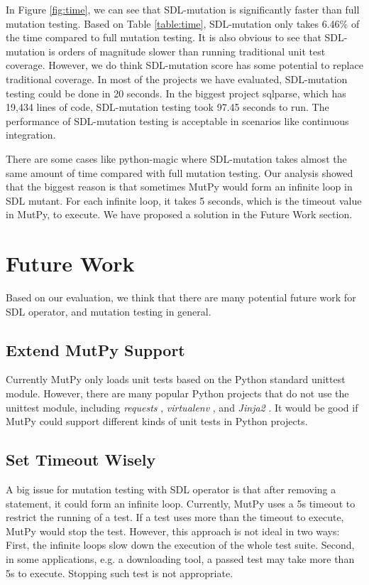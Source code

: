 \documentclass[12pt]{article}
\begin{document}
In Figure \ref{fig:time}, we can see that SDL-mutation is significantly faster than full mutation testing.  Based on Table \ref{table:time}, SDL-mutation only takes 6.46\% of the time compared to full mutation testing. It is also obvious to see that SDL-mutation is orders of magnitude slower than running traditional unit test coverage. However, we do think SDL-mutation score has some potential to replace traditional coverage. In most of the projects we have evaluated, SDL-mutation testing could be done in 20 seconds. In the biggest project sqlparse, which has 19,434 lines of code, SDL-mutation testing took 97.45 seconds to run. The performance of SDL-mutation testing is acceptable in scenarios like continuous integration.

There are some cases like python-magic where SDL-mutation takes almost the same amount of time compared with full mutation testing. Our analysis showed that the biggest reason is that sometimes MutPy would form an infinite loop in SDL mutant. For each infinite loop, it takes 5 seconds, which is the timeout value in MutPy, to execute. We have proposed a solution in the Future Work section.

\section{Future Work}

Based on our evaluation, we think that there are many potential future work for SDL operator, and mutation testing in general.

\subsection{Extend MutPy Support}

Currently MutPy only loads unit tests based on the Python standard unittest module. However, there are many popular Python projects that do not use the unittest module, including \emph{requests} \cite{requests}, \emph{virtualenv} \cite{virtualenv}, and \emph{Jinja2} \cite{jinja2}. It would be good if MutPy could support different kinds of unit tests in Python projects.

\subsection{Set Timeout Wisely}

A big issue for mutation testing with SDL operator is that after removing a statement, it could form an infinite loop. Currently, MutPy uses a 5s timeout to restrict the running of a test. If a test uses more than the timeout to execute, MutPy would stop the test. However, this approach is not ideal in two ways: First, the infinite loops slow down the execution of the whole test suite. Second, in some applications, e.g. a downloading tool, a passed test may take more than 5s to execute. Stopping such test is not appropriate.
\end{document}
